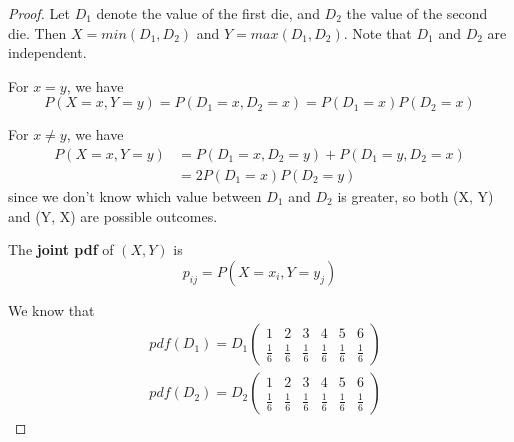 \documentclass{article}
\begin{document}
\begin{proof}
Let $D_{1}$ denote the value of the first die, and $D_{2}$ the value of the second die. Then $X = min(D_{1}, D_{2})$ and $Y = max(D_{1}, D_{2})$. Note that $D_{1}$ and $D_{2}$ are independent.

For $x = y$, we have 
\begin{equation}
    P(X = x, Y = y) = P(D_{1} = x, D_{2} = x) = P(D_{1} = x)P(D_{2} = x)
\end{equation}


For $x \neq y$, we have
\begin{equation}
\begin{split}
    P(X = x, Y = y) &= P(D_{1} = x, D_{2} = y) + P(D_{1} = y,D_{2} = x) \\
    &= 2P(D_{1} = x)P(D_{2} = y)
\end{split}
\end{equation}
since we don't know which value between $D_{1}$ and $D_{2}$ is greater, so both (X, Y) and (Y, X) are possible outcomes.

The \textbf{joint pdf} of $(X, Y)$ is
\begin{equation}
    p_{ij} = P(X = x_{i}, Y = y_{j})
\end{equation}

We know that 
\begin{equation}
    \begin{split}
        & pdf(D_{1}) = D_{1}\begin{pmatrix} 1 & 2 & 3 & 4 & 5 & 6 \\ \frac{1}{6} & \frac{1}{6} & \frac{1}{6} & \frac{1}{6} & \frac{1}{6} & \frac{1}{6}
        \end{pmatrix} \\
        & pdf(D_{2}) = D_{2} \begin{pmatrix} 1 & 2 & 3 & 4 & 5 & 6 \\ \frac{1}{6} & \frac{1}{6} & \frac{1}{6} & \frac{1}{6} & \frac{1}{6} & \frac{1}{6}
        \end{pmatrix}
    \end{split}
\end{equation}


\end{proof}
\end{document}
